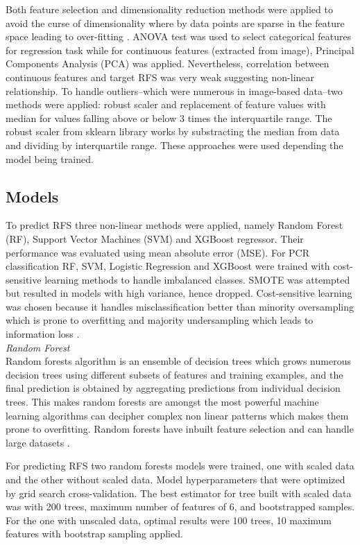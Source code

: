 \documentclass{article}
\begin{document}
Both feature selection and dimensionality reduction methods were applied to avoid the curse of dimensionality where by data points are sparse in the feature space leading to over-fitting \cite{geron2022hands}. ANOVA test was used to select categorical features for regression task while for continuous features (extracted from image), Principal Components Analysis (PCA) was applied. Nevertheless, correlation between continuous features and target RFS was very weak suggesting non-linear relationship. 
To handle outliers--which were numerous in image-based data--two methods were applied: robust scaler and replacement of feature values with median for values falling above or below 3 times the interquartile range. The robust scaler from sklearn library works by substracting the median from data and dividing by interquartile range. These approaches were used depending the model being trained. 

\subsection{Models}
To predict RFS three non-linear methods were applied, namely Random Forest (RF), Support Vector Machines (SVM) and XGBoost regressor. Their performance was evaluated using mean absolute error (MSE). For PCR classification RF, SVM, Logistic Regression and XGBoost were trained with cost-sensitive learning methods to handle imbalanced classes. SMOTE was attempted but resulted in models with high variance, hence dropped. Cost-sensitive learning was chosen because it handles misclassification better than minority oversampling which is prone to overfitting and majority  undersampling which leads to information loss \cite{abokadr2023imbalanced}. \\

\noindent\textit{Random Forest}\\
Random forests algorithm is an ensemble of decision trees which grows numerous decision trees using different subsets of features and training examples, and the final prediction is obtained by aggregating predictions from individual decision trees. This makes random forests are amongst the most powerful machine learning algorithms can decipher complex non linear patterns which makes them prone to overfitting. Random forests have inbuilt feature selection and can handle large datasets \cite{geron2022hands}. 

For predicting RFS two random forests models were trained, one with scaled data and the other without scaled data. Model hyperparameters that were optimized by grid search cross-validation. The best estimator for tree built with scaled data was with 200 trees, maximum number of features of 6, and bootstrapped samples. For the one with unscaled data, optimal results were 100 trees, 10 maximum features with bootstrap sampling applied.
\end{document}
